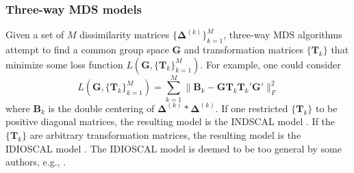 \documentclass[professionalfonts,hyperref={pdfpagelabels=false,colorlinks=true,linkcolor=cyan}]{beamer}
\begin{document}
\begin{frame}
  \frametitle{Three-way MDS models}
  Given a set of $M$ dissimilarity matrices
  $\{\bm{\Delta}^{(k)}\}_{k=1}^{M}$, three-way MDS algorithms attempt
  to find a common group space $\mathbf{G}$ and transformation
  matrices $\{\mathbf{T}_k\}$ that minimize some loss function
  $L(\mathbf{G},
  \{\mathbf{T}_k\}_{k=1}^{M})$. For example, one could consider
  \begin{equation}
    \label{eq:2}
    L(\mathbf{G}, \{\mathbf{T}_k\}_{k=1}^{M}) = \sum_{k = 1}^{M}\| \mathbf{B}_k -
    \mathbf{G}\mathbf{T}_k \mathbf{T}_k' \mathbf{G}' \|_F^2 
  \end{equation}
 where $\mathbf{B}_k$ is the double centering of $\bm{\Delta}^{(k)}
 \ast \bm{\Delta}^{(k)}$.
 \vskip10pt If one restricted $\{\mathbf{T}_k\}$ to be positive
 diagonal matrices, the resulting model is the INDSCAL
 model \cite{carroll70:_analy_n_eckar_young}. If the
 $\{\mathbf{T}_k\}$ are arbitrary transformation matrices, the
 resulting model is the IDIOSCAL model \cite{carroll74:_contem}. The
 IDIOSCAL model is deemed to be too general by some authors,
 e.g., \cite{carroll70:_analy_n_eckar_young}. 
\end{frame}
\end{document}
